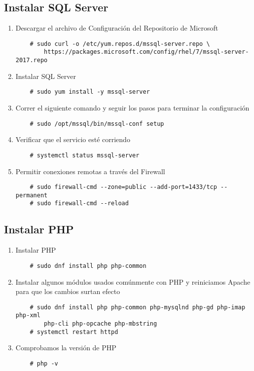 \subsection{Instalar SQL Server}
\begin{enumerate}
    \item Descargar el archivo de Configuración del Repositorio de Microsoft
    \begin{lstlisting}
    # sudo curl -o /etc/yum.repos.d/mssql-server.repo \
        https://packages.microsoft.com/config/rhel/7/mssql-server-2017.repo
    \end{lstlisting}
    \item Instalar SQL Server 
    \begin{lstlisting}
    # sudo yum install -y mssql-server
    \end{lstlisting}
    \item Correr el siguiente comando y seguir los pasos para terminar la configuración
    \begin{lstlisting}
    # sudo /opt/mssql/bin/mssql-conf setup
    \end{lstlisting}
    \item Verificar que el servicio esté corriendo
    \begin{lstlisting}
    # systemctl status mssql-server
    \end{lstlisting}
    \item Permitir conexiones remotas a través del Firewall
    \begin{lstlisting}
    # sudo firewall-cmd --zone=public --add-port=1433/tcp --permanent
    # sudo firewall-cmd --reload
    \end{lstlisting}
\end{enumerate}

\subsection{Instalar PHP}
\begin{enumerate}
    \item Instalar PHP
    \begin{lstlisting}
    # sudo dnf install php php-common
    \end{lstlisting}
    \item Instalar algunos módulos usados comúnmente con PHP y reiniciamos Apache para que los cambios surtan efecto
    \begin{lstlisting}
    # sudo dnf install php php-common php-mysqlnd php-gd php-imap php-xml 
        php-cli php-opcache php-mbstring
    # systemctl restart httpd
    \end{lstlisting}
    \item Comprobamos la versión de PHP
    \begin{lstlisting}
    # php -v
    \end{lstlisting}
\end{enumerate}

